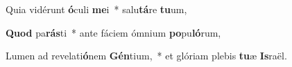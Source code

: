 \item Quia vidérunt \textbf{ó}culi \textbf{me}i~* salu\textbf{tá}re \textbf{tu}um,
\item \textbf{Quod} pa\textbf{rás}ti~* ante fáciem ómnium \textbf{po}pu\textbf{ló}rum,
\item Lumen ad revelati\textbf{ó}nem \textbf{Gén}tium,~* et glóriam plebis \textbf{tu}æ \textbf{Is}raël.
